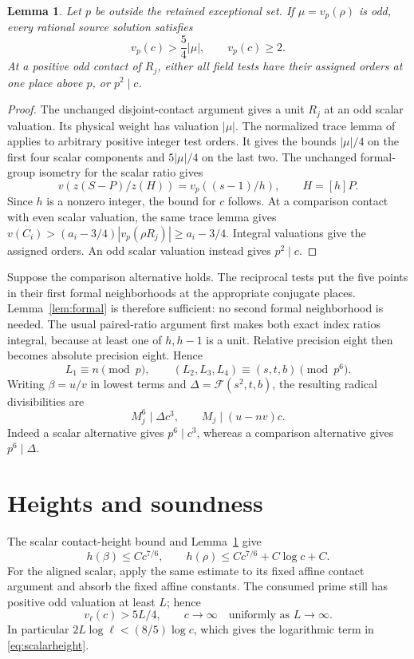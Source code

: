 \documentclass[11pt,a4paper]{article}
\newtheorem{lemma}[theorem]{Lemma}
\begin{document}
\begin{lemma}\label{lem:local}
Let \(p\) be outside the retained exceptional set.
If \(\mu=v_p(\rho)\) is odd, every rational source solution satisfies
\[
 v_p(c)>\frac54|\mu|,\qquad v_p(c)\ge2.
\]
At a positive odd contact of \(R_j\), either all field tests have
their assigned orders at one place above \(p\), or \(p^2\mid c\).
\end{lemma}
\begin{proof}
The unchanged disjoint-contact argument gives a unit \(R_j\) at an
odd scalar valuation. Its physical weight has valuation \(|\mu|\).
The normalized trace lemma of \cite{Reweighted} applies to arbitrary
positive integer test orders. It gives the bounds \(|\mu|/4\) on
the first four scalar components and \(5|\mu|/4\) on the last two.
The unchanged formal-group isometry for the scalar ratio gives
\[
 v(z(S-P)/z(H))=v_p((s-1)/h),\qquad H=[h]P.
\]
Since \(h\) is a nonzero integer, the bound for \(c\) follows.
At a comparison contact with even scalar valuation, the same trace
lemma gives
\(v(C_i)>(a_i-3/4)|v_p(\rho R_j)|\ge a_i-3/4\).
Integral valuations give the assigned orders. An odd scalar valuation
instead gives \(p^2\mid c\).
\end{proof}

Suppose the comparison alternative holds. The reciprocal tests put
the five points in their first formal neighborhoods at the appropriate
conjugate places. Lemma~\ref{lem:formal} is therefore sufficient:
no second formal neighborhood is needed. The usual paired-ratio
argument first makes both exact index ratios integral, because at
least one of \(h,h-1\) is a unit. Relative precision eight then becomes
absolute precision eight. Hence
\[
 L_1\equiv n\pmod p,\qquad
 (L_2,L_3,L_4)\equiv(s,t,b)\pmod{p^6}.
\]
Writing \(\beta=u/v\) in lowest terms and
\(\Delta=\mathcal F(s^2,t,b)\), the resulting radical divisibilities are
\begin{equation}\label{eq:divisibilities}
 M_j^6\mid\Delta c^3,\qquad M_j\mid(u-nv)c.
\end{equation}
Indeed a scalar alternative gives \(p^6\mid c^3\), whereas a
comparison alternative gives \(p^6\mid\Delta\).

\section{Heights and soundness}

The scalar contact-height bound and Lemma~\ref{lem:local} give
\begin{equation}\label{eq:scalarheight}
 h(\beta)\le Cc^{7/6},\qquad
 h(\rho)\le Cc^{7/6}+C\log c+C.
\end{equation}
For the aligned scalar, apply the same estimate to its fixed affine
contact argument and absorb the fixed affine constants. The consumed
prime still has positive odd valuation at least \(L\); hence
\[
 v_\ell(c)>5L/4,\qquad c\longrightarrow\infty
 \quad\text{uniformly as }L\longrightarrow\infty.
\]
In particular \(2L\log\ell<(8/5)\log c\), which gives the logarithmic
term in \eqref{eq:scalarheight}.
\end{document}
